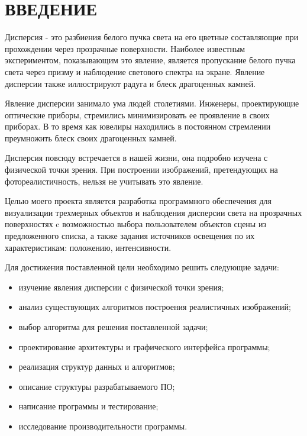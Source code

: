 \chapter*{ВВЕДЕНИЕ}

    Дисперсия - это разбиения белого пучка света на его цветные составляющие при прохождении через прозрачные поверхности. Наиболее известным экспериментом, показывающим это явление, является пропускание белого пучка света через призму и наблюдение светового спектра на экране. Явление дисперсии также иллюстрируют радуга и блеск драгоценных камней.

    Явление дисперсии занимало ума людей столетиями. Инженеры, проектирующие оптические приборы, стремились минимизировать ее проявление в своих приборах. В то время как ювелиры находились в постоянном стремлении преумножить блеск своих драгоценных камней.

    Дисперсия повсюду встречается в нашей жизни, она подробно изучена с физической точки зрения. При построении изображений, претендующих на фотореалистичность, нельзя не учитывать это явление.

    Целью моего проекта является разработка программного обеспечения для визуализации трехмерных объектов и наблюдения дисперсии света на прозрачных поверхностях c возможностью выбора пользователем объектов сцены из предложенного списка, а также задания источников освещения по их характеристикам: положению, интенсивности.

    Для достижения поставленной цели необходимо решить следующие задачи:

    \begin{itemize}
        \item изучение явления дисперсии с физической точки зрения;
        \item анализ существующих алгоритмов построения реалистичных изображений;
        \item выбор алгоритма для решения поставленной задачи;
        \item проектирование архитектуры и графического интерфейса программы;
        \item реализация структур данных и алгоритмов;
	    \item описание структуры разрабатываемого ПО;
	    \item написание программы и тестирование;
        \item исследование производительности программы.
    \end{itemize}
